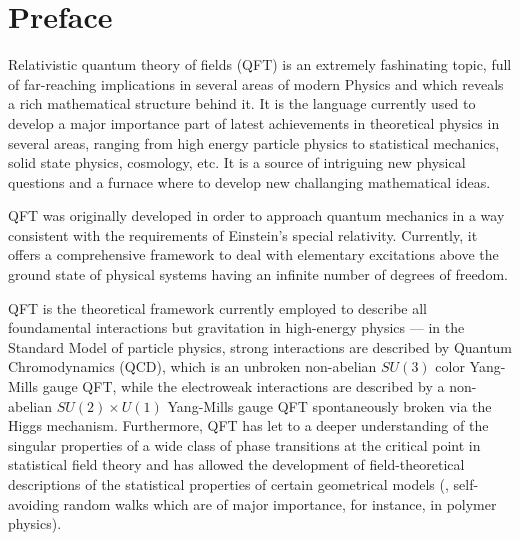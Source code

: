 
\chapter*{Preface}


Relativistic quantum theory of fields (QFT) is an extremely fashinating topic,
full of far-reaching implications in several areas of modern Physics and
which reveals a rich mathematical structure behind it. It is the language
currently 
used to develop a major importance part of latest achievements in theoretical
physics in several areas, ranging from high energy particle physics to 
statistical mechanics, solid state physics, cosmology,
etc. It is a source of
intriguing new physical questions and a furnace where to develop new challanging
mathematical ideas.
 

QFT was originally developed in order to approach
quantum mechanics in a way consistent with the requirements of Einstein's special relativity. 
Currently, it offers a comprehensive framework to
deal with
elementary excitations above the ground state of physical systems having an
infinite number of degrees of freedom.
 
QFT is the theoretical framework currently employed to
describe all foundamental interactions but
gravitation in high-energy physics --- in the Standard Model of 
particle physics,
strong interactions are described by Quantum Chromodynamics (QCD), which is 
an unbroken non-abelian $SU(3)$ color Yang-Mills gauge QFT, while the electroweak
interactions are described by a non-abelian $SU(2)
\times U(1)$ Yang-Mills gauge QFT spontaneously broken via the Higgs mechanism.
Furthermore, QFT has
let to a deeper understanding of the singular properties of a wide class of phase
transitions at the critical point in statistical field theory
and has allowed the development of field-theoretical descriptions
of the statistical properties of
certain geometrical models (\eg, self-avoiding random walks which are of major
importance, for instance,  
in polymer physics).

